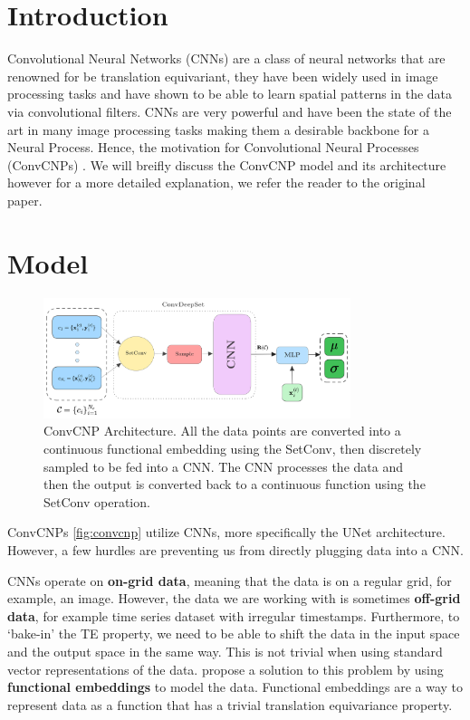 \documentclass[../../main.tex]{subfiles}
\begin{document}
\section{Introduction}

Convolutional Neural Networks (CNNs) are a class of neural networks that are renowned for be translation equivariant, they have been widely used in image processing tasks and have shown to be able to learn spatial patterns in the data via convolutional filters. CNNs are very powerful and have been the state of the art in many image processing tasks making them a desirable backbone for a Neural Process. Hence, the motivation for Convolutional Neural Processes (ConvCNPs) \cite{gordon2020convolutional}. We will breifly discuss the ConvCNP model and its architecture however for a more detailed explanation, we refer the reader to the original paper.

\section{Model}

\begin{figure}[H]
	\centering
	\includegraphics[width=0.8\textwidth]{convcnp.png}
	\caption{ConvCNP Architecture. All the data points are converted into a continuous functional embedding using the SetConv, then discretely sampled to be fed into a CNN. The CNN processes the data and then the output is converted back to a continuous function using the SetConv operation.}
	\label{fig:convcnp}
\end{figure}


ConvCNPs \cite{gordon2020convolutional} \autoref{fig:convcnp} utilize CNNs, more specifically the UNet \cite{ronneberger2015unet} architecture. However, a few hurdles are preventing us from directly plugging data into a CNN.

CNNs operate on \textbf{on-grid data}, meaning that the data is on a regular grid, for example, an image. However, the data we are working with is sometimes \textbf{off-grid data}, for example time series dataset with irregular timestamps. Furthermore, to `bake-in' the TE property, we need to be able to shift the data in the input space and the output space in the same way. This is not trivial when using standard vector representations of the data. \cite{gordon2020convolutional} propose a solution to this problem by using \textbf{functional embeddings} to model the data. Functional embeddings are a way to represent data as a function that has a trivial translation equivariance property. 
\end{document}

